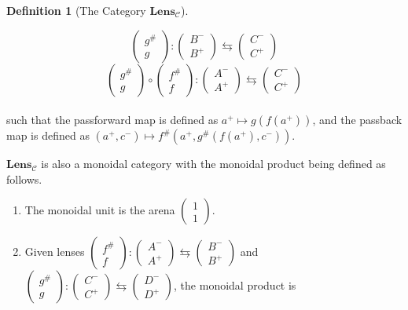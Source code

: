 \documentclass{article}
\theoremstyle{definition}
\newtheorem{definition}{Definition}
\begin{document}
\begin{definition}[The Category $\textbf{Lens}_\mathcal{C}$]
\begin{enumerate}
              $$\begin{pmatrix}g^{\#}\\g\end{pmatrix}:\begin{pmatrix}B^-\\B^+\end{pmatrix}\leftrightarrows\begin{pmatrix}C^-\\C^+\end{pmatrix}$$
              $$\begin{pmatrix}g^{\#}\\g\end{pmatrix} \circ \begin{pmatrix}f^{\#}\\f\end{pmatrix}:\begin{pmatrix}A^-\\A^+\end{pmatrix}\leftrightarrows\begin{pmatrix}C^-\\C^+\end{pmatrix}$$
              \\such that the passforward map is defined as $a^+ \mapsto g(f(a^+))$,
              and the passback map is defined as $(a^+, c^-) \mapsto f^\#(a^+, g^\#(f(a^+), c^-))$.
    \end{enumerate}
    $\textbf{Lens}_{\mathcal{C}}$ is also a monoidal category with the monoidal product being defined as follows.
    \begin{enumerate}
        \item The monoidal unit is the arena $\begin{pmatrix}1\\1\end{pmatrix}$.
        \item Given lenses $\begin{pmatrix}f^{\#}\\f\end{pmatrix}:\begin{pmatrix}A^-\\A^+\end{pmatrix}\leftrightarrows\begin{pmatrix}B^-\\B^+\end{pmatrix}$
              and $\begin{pmatrix}g^{\#}\\g\end{pmatrix}:\begin{pmatrix}C^-\\C^+\end{pmatrix}\leftrightarrows\begin{pmatrix}D^-\\D^+\end{pmatrix}$, the monoidal product is

\end{enumerate}
\end{definition}
\end{document}
